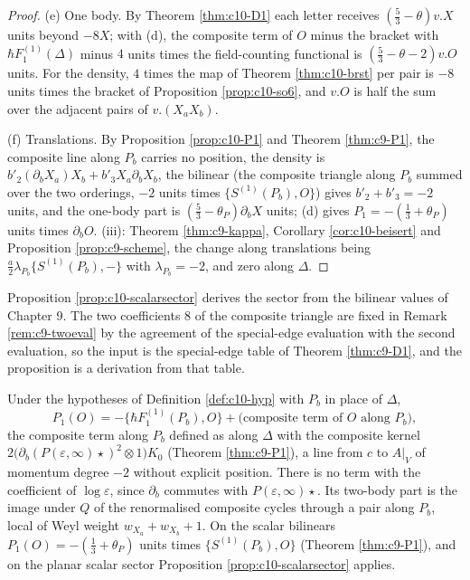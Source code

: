 \begin{proof}
(e) One body. By Theorem \ref{thm:c10-D1} each letter receives $(\tfrac53-\theta)v.X$ units beyond $-8X$; with (d), the composite term of $O$ minus the bracket with $\hbar F_1^{(1)}(\Delta)$ minus $4$ units times the field-counting functional is $(\tfrac53-\theta-2)v.O$ units. For the density, $4$ times the map of Theorem \ref{thm:c10-brst} per pair is $-8$ units times the bracket of Proposition \ref{prop:c10-so6}, and $v.O$ is half the sum over the adjacent pairs of $v.(X_aX_b)$.

(f) Translations. By Proposition \ref{prop:c10-P1} and Theorem \ref{thm:c9-P1}, the composite line along $P_b$ carries no position, the density is $b'_2(\partial_bX_a)X_b+b'_3X_a\partial_bX_b$, the bilinear (the composite triangle along $P_b$ summed over the two orderings, $-2$ units times $\{S^{(1)}(P_b),O\}$) gives $b'_2+b'_3=-2$ units, and the one-body part is $(\tfrac53-\theta_P)\partial_bX$ units; (d) gives $P_1=-(\tfrac13+\theta_P)$ units times $\partial_bO$. (iii): Theorem \ref{thm:c9-kappa}, Corollary \ref{cor:c10-beisert} and Proposition \ref{prop:c9-scheme}, the change along translations being $\tfrac a2\lambda_{P_b}\{S^{(1)}(P_b),-\}$ with $\lambda_{P_b}=-2$, and zero along $\Delta$.
\end{proof}

\begin{remark}
\label{rem:c10-inputs}
Proposition \ref{prop:c10-scalarsector} derives the sector from the bilinear values of Chapter 9. The two coefficients $8$ of the composite triangle are fixed in Remark \ref{rem:c9-twoeval} by the agreement of the special-edge evaluation with the second evaluation, so the input is the special-edge table of Theorem \ref{thm:c9-D1}, and the proposition is a derivation from that table.
\end{remark}

\begin{proposition}
\label{prop:c10-P1}
Under the hypotheses of Definition \ref{def:c10-hyp} with $P_b$ in place of $\Delta$,
\[
P_1(O)=-\big\{\hbar F_1^{(1)}(P_b),O\big\}+\big(\text{composite term of }O\text{ along }P_b\big),
\]
the composite term along $P_b$ defined as along $\Delta$ with the composite kernel $2\big(\partial_b(P(\varepsilon,\infty)\star)^2\otimes1\big)K_0$ (Theorem \ref{thm:c9-P1}), a line from $c$ to $A|_V$ of momentum degree $-2$ without explicit position. There is no term with the coefficient of $\log\varepsilon$, since $\partial_b$ commutes with $P(\varepsilon,\infty)\star$. Its two-body part is the image under $Q$ of the renormalised composite cycles through a pair along $P_b$, local of Weyl weight $w_{X_a}+w_{X_b}+1$. On the scalar bilinears $P_1(O)=-(\tfrac13+\theta_P)$ units times $\{S^{(1)}(P_b),O\}$ (Theorem \ref{thm:c9-P1}), and on the planar scalar sector Proposition \ref{prop:c10-scalarsector} applies.
\end{proposition}

